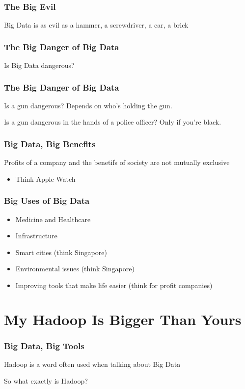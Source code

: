 \documentclass{beamer}
\begin{document}
\begin{frame}
\frametitle{The Big Evil}
Big Data is as evil as a hammer, a screwdriver, a car, a brick
\end{frame}

\begin{frame}
\frametitle{The Big Danger of Big Data}
Is Big Data dangerous?
\end{frame}

\begin{frame}
\frametitle{The Big Danger of Big Data}
Is a gun dangerous? \pause Depends on who's holding the gun. \pause

Is a gun dangerous in the hands of a police officer? \pause Only if you're black.
\end{frame}

\begin{frame}
\frametitle{Big Data, Big Benefits}
Profits of a company and the benetifs of society are not mutually exclusive \pause

\begin{itemize}
    \item Think Apple Watch
\end{itemize}
\end{frame}

\begin{frame}
\frametitle{Big Uses of Big Data}
\begin{itemize}
    \item Medicine and Healthcare
    \item Infrastructure
    \item Smart cities (think Singapore)
    \item Environmental issues (think Singapore)
    \item Improving tools that make life easier (think for profit companies)
\end{itemize}
\end{frame}

\section{My Hadoop Is Bigger Than Yours}

\begin{frame}
\frametitle{Big Data, Big Tools}
Hadoop is a word often used when talking about Big Data \pause

So what exactly is Hadoop?
\end{frame}
\end{document}

